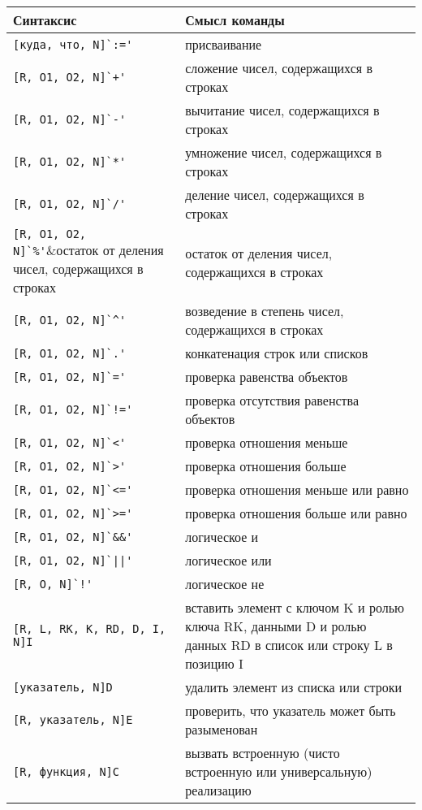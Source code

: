 \documentclass{report}
\begin{document}
    \begin{tabular}{|l|p{10cm}|}
        \hline
        Синтаксис&Смысл команды\\
        \hline
        \verb|[куда, что, N]`:='|&присваивание\\
        \hline
        \verb|[R, O1, O2, N]`+'|&сложение чисел, содержащихся в строках\\
        \verb|[R, O1, O2, N]`-'|&вычитание чисел, содержащихся в строках\\
        \verb|[R, O1, O2, N]`*'|&умножение чисел, содержащихся в строках\\
        \verb|[R, O1, O2, N]`/'|&деление чисел, содержащихся в строках\\
        \verb|[R, O1, O2, N]`%'|&остаток от деления чисел, содержащихся в строках\\
        \verb|[R, O1, O2, N]`^'|&возведение в степень чисел, содержащихся в строках\\
        \verb|[R, O1, O2, N]`.'|&конкатенация строк или списков\\
        \hline
        \verb|[R, O1, O2, N]`='|&проверка равенства объектов\\
        \verb|[R, O1, O2, N]`!='|&проверка отсутствия равенства объектов\\
        \verb|[R, O1, O2, N]`<'|&проверка отношения меньше\\
        \verb|[R, O1, O2, N]`>'|&проверка отношения больше\\
        \verb|[R, O1, O2, N]`<='|&проверка отношения меньше или равно\\
        \verb|[R, O1, O2, N]`>='|&проверка отношения больше или равно\\
        \hline
        \verb|[R, O1, O2, N]`&&'|&логическое и\\
        \verb+[R, O1, O2, N]`||'+&логическое или\\
        \verb|[R, O, N]`!'|&логическое не\\
        \hline
        \verb|[R, L, RK, K, RD, D, I, N]I|&вставить элемент с ключом K и ролью ключа RK, данными D и ролью данных RD в список или строку L в позицию I \\
        \verb|[указатель, N]D|&удалить элемент из списка или строки\\
        \verb|[R, указатель, N]E|&проверить, что указатель может быть разыменован\\
        \verb|[R, функция, N]C|&вызвать встроенную (чисто встроенную или универсальную) реализацию\\

\end{tabular}
\end{document}
